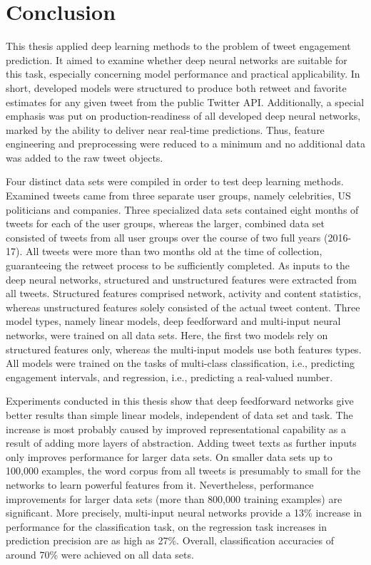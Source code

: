 \section{Conclusion}
\label{ch:conclusion}

This thesis applied deep learning methods to the problem of tweet engagement
prediction.
It aimed to examine whether deep neural networks are suitable for this task, 
especially concerning model performance and practical applicability.
In short, developed models were structured to produce both retweet and favorite
estimates for any given tweet from the public Twitter API.
Additionally, a special emphasis was put on production-readiness of all
developed deep neural networks, marked by the ability to deliver near real-time
predictions.
Thus, feature engineering and preprocessing were reduced to a minimum and no
additional data was added to the raw tweet objects.

Four distinct data sets were compiled in order to test deep learning methods.
Examined tweets came from three separate user groups, namely celebrities, US
politicians and companies.
Three specialized data sets contained eight months of tweets for each of the user
groups, whereas the larger, combined data set consisted of tweets from all
user groups over the course of two full years (2016-17).
All tweets were more than two months old at the time of collection, guaranteeing
the retweet process to be sufficiently completed.
As inputs to the deep neural networks, structured and unstructured features
were extracted from all tweets.
Structured features comprised network, activity and content statistics, whereas
unstructured features solely consisted of the actual tweet content.
Three model types, namely linear models, deep feedforward and multi-input
neural networks, were trained on all data sets.
Here, the first two models rely on structured features only, whereas the multi-input
models use both features types.
All models were trained on the tasks of multi-class classification, i.e.,
predicting engagement intervals, and regression, i.e., predicting a real-valued
number.

Experiments conducted in this thesis show that deep feedforward networks
give better results than simple linear models, independent of data set and task.
The increase is most probably caused by improved representational capability
as a result of adding more layers of abstraction.
Adding tweet texts as further inputs only improves performance for larger data
sets.
On smaller data sets up to 100,000 examples, the word corpus from all tweets
is presumably to small for the networks to learn powerful features from it.
Nevertheless, performance improvements for larger data sets (more than 800,000
training examples) are significant.
More precisely, multi-input neural networks provide a 13\% increase in performance
for the classification task, on the regression task increases in prediction
precision are as high as 27\%.
Overall, classification accuracies of around 70\% were achieved on all data sets.
